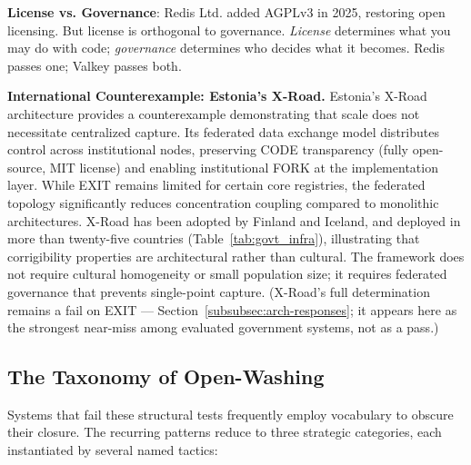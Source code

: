 \documentclass{article}
\begin{document}
\textbf{License vs. Governance}: Redis Ltd. added AGPLv3 in 2025, restoring open licensing. But license is orthogonal to governance. \textit{License} determines what you may do with code; \textit{governance} determines who decides what it becomes. Redis passes one; Valkey passes both.

\textbf{International Counterexample: Estonia's X-Road.} Estonia's X-Road architecture provides a counterexample demonstrating that scale does not necessitate centralized capture. Its federated data exchange model distributes control across institutional nodes, preserving CODE transparency (fully open-source, MIT license) and enabling institutional FORK at the implementation layer. While EXIT remains limited for certain core registries, the federated topology significantly reduces concentration coupling compared to monolithic architectures. X-Road has been adopted by Finland and Iceland, and deployed in more than twenty-five countries (Table~\ref{tab:govt_infra}), illustrating that corrigibility properties are architectural rather than cultural. The framework does not require cultural homogeneity or small population size; it requires federated governance that prevents single-point capture. (X-Road's full determination remains a fail on EXIT --- Section~\ref{subsubsec:arch-responses}; it appears here as the strongest near-miss among evaluated government systems, not as a pass.)

\subsection{The Taxonomy of Open-Washing}
\label{subsec:openwashing}

Systems that fail these structural tests frequently employ vocabulary to obscure their closure. The recurring patterns reduce to three strategic categories, each instantiated by several named tactics:
\end{document}
